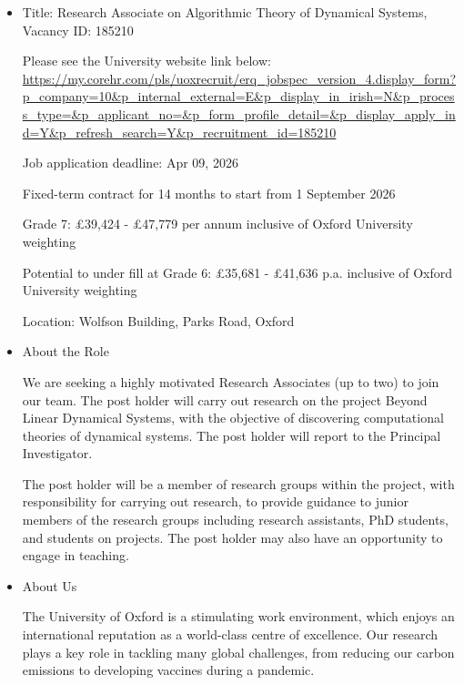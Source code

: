 \documentclass[prodmode,acmtecs]{acmsmall} %
\begin{document}
\begin{itemize}\item  Title: Research Associate on Algorithmic Theory of Dynamical Systems, Vacancy ID: 185210  
 
  Please see the University website link below: \href{https://my.corehr.com/pls/uoxrecruit/erq_jobspec_version_4.display_form?p_company=10\&p_internal_external=E\&p_display_in_irish=N\&p_process_type=\&p_applicant_no=\&p_form_profile_detail=\&p_display_apply_ind=Y\&p_refresh_search=Y\&p_recruitment_id=185210}{https://my.corehr.com/pls/uoxrecruit/erq\_jobspec\_version\_4.display\_form?p\_company=10\&p\_internal\_external=E\&p\_display\_in\_irish=N\&p\_process\_type=\&p\_applicant\_no=\&p\_form\_profile\_detail=\&p\_display\_apply\_ind=Y\&p\_refresh\_search=Y\&p\_recruitment\_id=185210} 
 
Job application deadline: Apr 09, 2026 
 
  Fixed-term contract for 14 months to start from 1 September 2026 
 
  Grade 7: £39,424 - £47,779 per annum inclusive of Oxford University weighting 
 
  Potential to under fill at Grade 6: £35,681 - £41,636 p.a. inclusive of Oxford University weighting 
 
  Location: Wolfson Building, Parks Road, Oxford 
 
\item  About the Role 
 
  We are seeking a highly motivated Research Associates (up to two) to join our team. The post holder will carry out research on the project Beyond Linear Dynamical Systems, with the objective of discovering computational theories of dynamical systems. The post holder will report to the Principal Investigator. 
 
  The post holder will be a member of research groups within the project, with responsibility for carrying out research, to provide guidance to junior members of the research groups including research assistants, PhD students, and students on projects. The post holder may also have an opportunity to engage in teaching. 
 
\item  About Us 
 
  The University of Oxford is a stimulating work environment, which enjoys an international reputation as a world-class centre of excellence. Our research plays a key role in tackling many global challenges, from reducing our carbon emissions to developing vaccines during a pandemic. 
 

\end{itemize}
\end{document}
